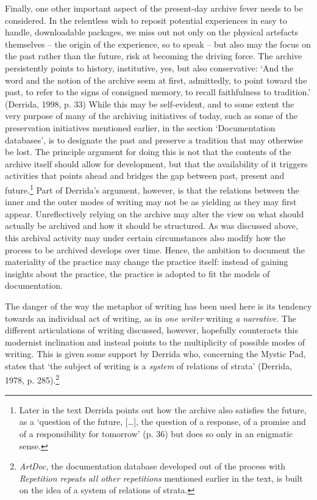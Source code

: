 Finally, one other important aspect of the present-day archive fever
needs to be considered. In the relentless wish to reposit potential
experiences in easy to handle, downloadable packages, we miss out not
only on the physical artefacts themselves -- the origin of the
experience, so to speak -- but also may the focus on the past rather
than the future, risk at becoming the driving force. The archive
persistently points to history, institutive, yes, but also conservative:
`And the word and the notion of the archive seem at first, admittedly,
to point toward the past, to refer to the signs of consigned memory, to
recall faithfulness to tradition.' (Derrida, 1998, p. 33) While this may
be self-evident, and to some extent the very purpose of many of the
archiving initiatives of today, such as some of the preservation
initiatives mentioned earlier, in the section `Documentation databases',
is to designate the past and preserve a tradition that may otherwise be
lost. The principle argument for doing this is not that the contents of
the archive itself should allow for development, but that the
availability of it triggers activities that points ahead and bridges the
gap between past, present and future.\footnote{Later in the text Derrida
  points out how the archive also satisfies the future, as a `question
  of the future, {[}\ldots{}{]}, the question of a response, of a
  promise and of a responsibility for tomorrow' (p. 36) but does so only
  in an enigmatic sense.} Part of Derrida's argument, however, is that
the relations between the inner and the outer modes of writing may not
be as yielding as they may first appear. Unreflectively relying on the
archive may alter the view on what should actually be archived and how
it should be structured. As was discussed above, this archival activity
may under certain circumstances also modify how the process to be
archived develops over time. Hence, the ambition to document the
materiality of the practice may change the practice itself: instead of
gaining insights about the practice, the practice is adopted to fit the
models of documentation.

The danger of the way the metaphor of writing has been used here is its
tendency towards an individual act of writing, as in \emph{one writer}
writing \emph{a} \emph{narrative}. The different articulations of
writing discussed, however, hopefully counteracts this modernist
inclination and instead points to the multiplicity of possible modes of
writing. This is given some support by Derrida who, concerning the
Mystic Pad, states that `the subject of writing is a \emph{system} of
relations of strata' (Derrida, 1978, p. 285).\footnote{\emph{ArtDoc},
  the documentation database developed out of the process with
  \emph{Repetition repeats all other repetitions} mentioned earlier in
  the text, is built on the idea of a system of relations of strata.}


